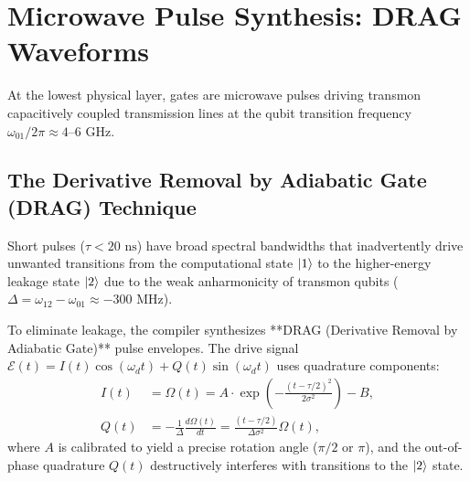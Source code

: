 \section{Microwave Pulse Synthesis: DRAG Waveforms}
\label{sec:microwave_pulse_synthesis}

At the lowest physical layer, gates are microwave pulses driving transmon capacitively coupled transmission lines at the qubit transition frequency $\omega_{01}/2\pi \approx 4\text{--}6\text{ GHz}$.

\subsection{The Derivative Removal by Adiabatic Gate (DRAG) Technique}
Short pulses ($\tau < 20\text{ ns}$) have broad spectral bandwidths that inadvertently drive unwanted transitions from the computational state $\ket{1}$ to the higher-energy leakage state $\ket{2}$ due to the weak anharmonicity of transmon qubits ($\Delta = \omega_{12} - \omega_{01} \approx -300\text{ MHz}$).

To eliminate leakage, the compiler synthesizes **DRAG (Derivative Removal by Adiabatic Gate)** pulse envelopes. The drive signal $\mathcal{E}(t) = I(t)\cos(\omega_d t) + Q(t)\sin(\omega_d t)$ uses quadrature components:
\begin{align}
    I(t) &= \Omega(t) = A \cdot \exp\left( -\frac{(t - \tau/2)^2}{2\sigma^2} \right) - B, \label{eq:drag_i} \\
    Q(t) &= -\frac{1}{\Delta} \frac{d\Omega(t)}{dt} = \frac{(t - \tau/2)}{\Delta \sigma^2} \Omega(t), \label{eq:drag_q}
\end{align}
where $A$ is calibrated to yield a precise rotation angle ($\pi/2$ or $\pi$), and the out-of-phase quadrature $Q(t)$ destructively interferes with transitions to the $\ket{2}$ state.

